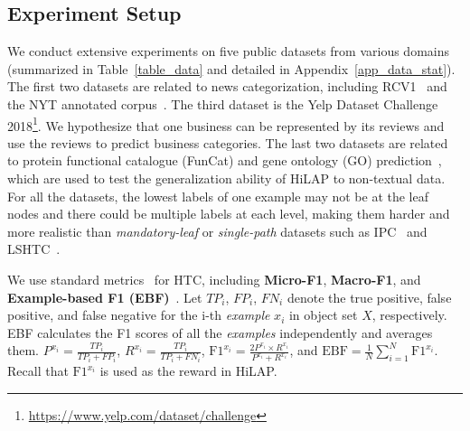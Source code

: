 \documentclass[11pt,a4paper]{article}
\newcommand{\start}[1]{\vspace{1.8mm}\noindent{{\bf #1}}}
\begin{document}
\subsection{Experiment Setup}
\start{Datasets.}
We conduct extensive experiments on five public datasets from various domains (summarized in Table~\ref{table_data} and detailed in Appendix~\ref{app_data_stat}).
The first two datasets are related to news categorization, including RCV1~\citep{lewis2004rcv1} and the NYT annotated corpus~\citep{sandhaus2008new}.
The third dataset is the Yelp Dataset Challenge 2018\footnote{\url{https://www.yelp.com/dataset/challenge}}.
We hypothesize that one business can be represented by its reviews and use the reviews to predict business categories.
The last two datasets are related to protein functional catalogue (FunCat) and gene ontology (GO) prediction~\cite{vens2008decision}, which are used to test the generalization ability of HiLAP to non-textual data.
For all the datasets, the lowest labels of one example may not be at the leaf nodes and there could be multiple labels at each level, making them harder and more realistic than \textit{mandatory-leaf} or \textit{single-path} datasets such as IPC~\cite{wipo2014international} and LSHTC~\cite{PartalasKBAPGAA15}.

\start{Evaluation Metrics.}
\label{subsec:metric}
We use standard metrics~\citep{johnson2014effective,Meng2018WeaklySupervisedNT,peng2018large} for HTC, including \textbf{Micro-F1}, \textbf{Macro-F1}, and \textbf{Example-based F1 (EBF)}~\cite{PartalasKBAPGAA15,peng2016deepmesh}.
Let $TP_i$, $FP_i$, $FN_i$ denote the true positive, false positive, and false negative for the i-th \textit{example} $x_i$ in object set $X$, respectively.
EBF calculates the F1 scores of all the \textit{examples} independently and averages them.
$P^{x_i} = \frac{TP_i}{TP_i + FP_i}$, $R^{x_i} = \frac{TP_i}{TP_i + FN_i}$, $\text{F1}^{x_i}=\frac{2P^{x_i} \times R^{x_i}}{P^{x_i} + R^{x_i}}$, and $\text{EBF} = \frac{1}{N} \sum_{i=1}^N \text{F1}^{x_i}$. 
Recall that $\text{F1}^{x_i}$ is used as the reward in HiLAP.
\end{document}
